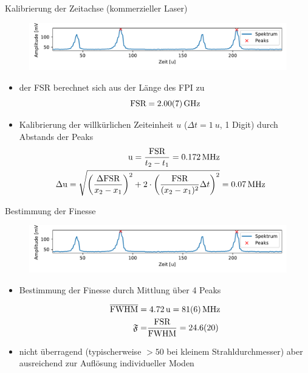 \documentclass[10pt, aspectratio=169]{beamer}
\begin{document}
\begin{frame}{Kalibrierung der Zeitachse (kommerzieller Laser)}
  \begin{figure}
    \includegraphics[width=1\columnwidth]{figs/fsrkalib.pdf}
  \end{figure}
  \begin{itemize}
  \item<1-> der FSR berechnet sich aus der L\"ange des FPI zu
    \begin{equation}
      \label{eq:realfsr}
      \text{FSR} = \SI{2.00+-0.07}{\giga\hertz}
    \end{equation}
  \item<2-> Kalibrierung der willk\"urlichen Zeiteinheit \(u\)
    (\(\Delta t = \SI{1}{u}\), 1 Digit) durch Abstands der Peaks
    \begin{eqnarray}
      \label{eq:unithertz}
      \si{u} = \frac{\text{FSR}}{t_2-t_1} =\SI{.172}{\mega\hertz} \\
      \Delta\si{u}  = \sqrt{\qty(\frac{\Delta\text{FSR}}{x_2-x_1})^2 +
      2\cdot\qty(\frac{\text{FSR}}{(x_2-x_1)^2}\Delta t)^2}  & = \SI{.07}{\mega\hertz}
    \end{eqnarray}
  \end{itemize}
\end{frame}

\begin{frame}{Bestimmung der Finesse}
  \begin{figure}
    \includegraphics[width=1\columnwidth]{figs/fsrkalib.pdf}
  \end{figure}
  \begin{itemize}
  \item<2-> Bestimmung der Finesse durch Mittlung \"uber 4 Peaks

    \begin{align}
      \label{eq:fwhmlaser}
      \overline{\text{FWHM}} =&\; \SI{4.72}{u} = \SI{81\pm
                                6}{\mega\hertz} \\
      \mathfrak{F} =& \frac{\text{FSR}}{\text{FWHM}}=\SI{24.6\pm 2.0}{}
    \end{align}
  \item<3-> nicht \"uberragend (typischerweise \(> 50\) bei kleinem
    Strahldurchmesser\cite{HENDOW1997343}) aber ausreichend zur
    Aufl\"osung individueller Moden
  \end{itemize}
\end{frame}
\end{document}
